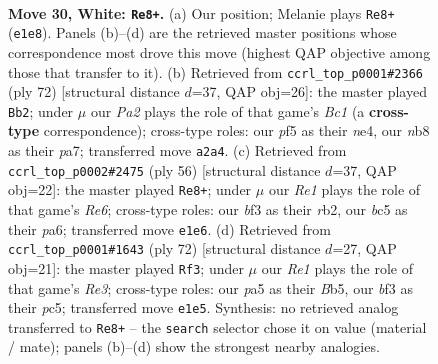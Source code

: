 \documentclass[11pt]{article}
\begin{document}
\clearpage

\begin{figure}[p]\centering
\begin{subfigure}{0.46\textwidth}\centering
\resizebox{\linewidth}{!}{%
\newchessgame
\chessboard[
  setfen={1n3k2/8/8/ppb2p2/8/5b2/P4r2/4R1K1 w - - 2 30},
  showmover=false,
  pgfstyle=straightmove, color=movearrow, markmove={e1-e8}
]}
\caption{}
\end{subfigure}\hfill
\begin{subfigure}{0.46\textwidth}\centering
\resizebox{\linewidth}{!}{%
\newchessgame
\chessboard[
  setfen={8/pp4p1/4k3/8/1P2n3/3R4/P4b1K/R1B3r1 w - - 1 37},
  showmover=false,
  pgfstyle=straightmove, color=movearrow, markmove={c1-b2}
]}
\caption{}
\end{subfigure}
\\[4pt]
\begin{subfigure}{0.46\textwidth}\centering
\resizebox{\linewidth}{!}{%
\newchessgame
\chessboard[
  setfen={2k5/6R1/p1p1R3/8/8/2P5/Pr1r4/4K3 w - - 0 29},
  showmover=false,
  pgfstyle=straightmove, color=movearrow, markmove={e6-e8}
]}
\caption{}
\end{subfigure}\hfill
\begin{subfigure}{0.46\textwidth}\centering
\resizebox{\linewidth}{!}{%
\newchessgame
\chessboard[
  setfen={2k5/5p2/8/1Bp5/1b6/1P2R3/3r4/2K5 w - - 1 37},
  showmover=false,
  pgfstyle=straightmove, color=movearrow, markmove={e3-f3}
]}
\caption{}
\end{subfigure}
\caption{\textbf{Move 30, White: \texttt{Re8+}.} (a) Our position; Melanie plays \texttt{Re8+} (\texttt{e1e8}). Panels (b)--(d) are the retrieved master positions whose correspondence most drove this move (highest QAP objective among those that transfer to it). (b) Retrieved from \texttt{ccrl\_top\_p0001\#2366} (ply 72) [structural distance $d$=37, QAP obj=26]: the master played \texttt{Bb2}; under $\mu$ our \emph{Pa2} plays the role of that game's \emph{Bc1} (a \textbf{cross-type} correspondence); cross-type roles: our \emph{p}f5 as their \emph{n}e4, our \emph{n}b8 as their \emph{p}a7; transferred move \texttt{a2a4}. (c) Retrieved from \texttt{ccrl\_top\_p0002\#2475} (ply 56) [structural distance $d$=37, QAP obj=22]: the master played \texttt{Re8+}; under $\mu$ our \emph{Re1} plays the role of that game's \emph{Re6}; cross-type roles: our \emph{b}f3 as their \emph{r}b2, our \emph{b}c5 as their \emph{p}a6; transferred move \texttt{e1e6}. (d) Retrieved from \texttt{ccrl\_top\_p0001\#1643} (ply 72) [structural distance $d$=27, QAP obj=21]: the master played \texttt{Rf3}; under $\mu$ our \emph{Re1} plays the role of that game's \emph{Re3}; cross-type roles: our \emph{p}a5 as their \emph{B}b5, our \emph{b}f3 as their \emph{p}c5; transferred move \texttt{e1e5}. Synthesis: no retrieved analog transferred to \texttt{Re8+} -- the \texttt{search} selector chose it on value (material / mate); panels (b)--(d) show the strongest nearby analogies.}
\label{fig:thought-m58}
\end{figure}
\end{document}
